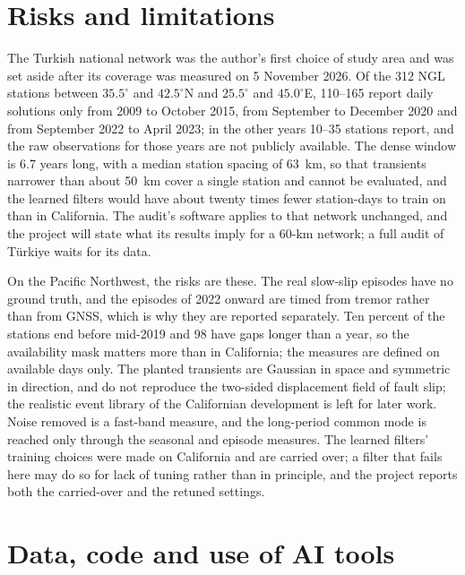 \documentclass[preprint,12pt,authoryear]{elsarticle}
\begin{document}
\section{Risks and limitations}
\label{sec:risks}

The Turkish national network was the author's first choice of study area and was set aside after its coverage was measured on 5 November 2026. Of the 312 NGL stations between $35.5^\circ$ and $42.5^\circ$N and $25.5^\circ$ and $45.0^\circ$E, 110--165 report daily solutions only from 2009 to October 2015, from September to December 2020 and from September 2022 to April 2023; in the other years 10--35 stations report, and the raw observations for those years are not publicly available. The dense window is 6.7 years long, with a median station spacing of 63~km, so that transients narrower than about 50~km cover a single station and cannot be evaluated, and the learned filters would have about twenty times fewer station-days to train on than in California. The audit's software applies to that network unchanged, and the project will state what its results imply for a 60-km network; a full audit of T\"urkiye waits for its data.

On the Pacific Northwest, the risks are these. The real slow-slip episodes have no ground truth, and the episodes of 2022 onward are timed from tremor rather than from GNSS, which is why they are reported separately. Ten percent of the stations end before mid-2019 and 98 have gaps longer than a year, so the availability mask matters more than in California; the measures are defined on available days only. The planted transients are Gaussian in space and symmetric in direction, and do not reproduce the two-sided displacement field of fault slip; the realistic event library of the Californian development is left for later work. Noise removed is a fast-band measure, and the long-period common mode is reached only through the seasonal and episode measures. The learned filters' training choices were made on California and are carried over; a filter that fails here may do so for lack of tuning rather than in principle, and the project reports both the carried-over and the retuned settings.

\section{Data, code and use of AI tools}
\label{sec:availability}
\end{document}
